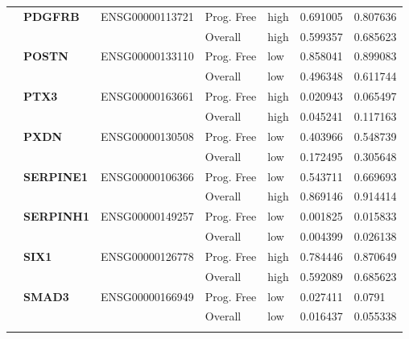 \begin{spacing}{1}
{\begin{longtable}{|>{\bfseries}p{2cm}|>{\bfseries}p{1.9cm}|p{2.8cm}|p{2cm}|p{2cm}|p{1.5cm}|p{1.5cm}|}
            \hhline{~======}
             & PDGFRB   & ENSG00000113721 & Prog. Free & high & 0.691005 & 0.807636 \\
            \hhline{~~~----}
             &          &                 & Overall    & high & 0.599357 & 0.685623 \\
            \hhline{~======}
             & POSTN    & ENSG00000133110 & Prog. Free & low  & 0.858041 & 0.899083 \\
            \hhline{~~~----}
             &          &                 & Overall    & low  & 0.496348 & 0.611744 \\
            \hhline{~======}
             & PTX3     & ENSG00000163661 & Prog. Free & high & 0.020943 & 0.065497 \\
            \hhline{~~~----}
             &          &                 & Overall    & high & 0.045241 & 0.117163 \\
            \hhline{~======}
             & PXDN     & ENSG00000130508 & Prog. Free & low  & 0.403966 & 0.548739 \\
            \hhline{~~~----}
             &          &                 & Overall    & low  & 0.172495 & 0.305648 \\
            \hhline{~======}
             & SERPINE1 & ENSG00000106366 & Prog. Free & low  & 0.543711 & 0.669693 \\
            \hhline{~~~----}
             &          &                 & Overall    & high & 0.869146 & 0.914414 \\
            \hhline{~======}
             & SERPINH1 & ENSG00000149257 & Prog. Free & low  & 0.001825 & 0.015833 \\
            \hhline{~~~----}
             &          &                 & Overall    & low  & 0.004399 & 0.026138 \\
            \hhline{~======}
             & SIX1     & ENSG00000126778 & Prog. Free & high & 0.784446 & 0.870649 \\
            \hhline{~~~----}
             &          &                 & Overall    & high & 0.592089 & 0.685623 \\
            \hhline{~======}
             & SMAD3    & ENSG00000166949 & Prog. Free & low  & 0.027411 & 0.0791   \\
            \hhline{~~~----}
             &          &                 & Overall    & low  & 0.016437 & 0.055338 \\
            \hhline{~======}

\end{longtable}}
\end{spacing}
